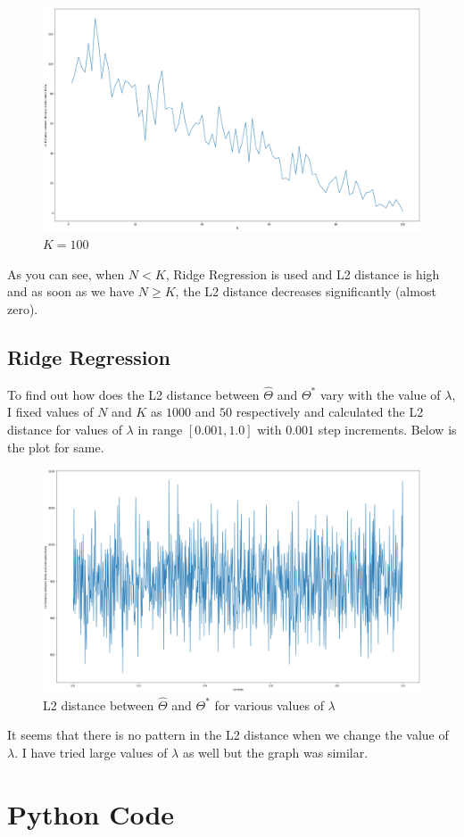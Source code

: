\documentclass{article}
\begin{document}
\begin{figure}[H]
  \includegraphics[width=\linewidth]{images/k-100.png}
  \caption{$K=100$}
\end{figure}

As you can see, when $N<K$, Ridge Regression is used and L2 distance is high and as soon as we have $N \geq K$, the L2 distance decreases significantly (almost zero).

\subsection{Ridge Regression}
To find out how does the L2 distance between $\hat{\Theta}$ and $\Theta^{*}$ vary with the value of $\lambda$, I fixed values of $N$ and $K$ as $1000$ and $50$ respectively and calculated the L2 distance for values of $\lambda$ in range $[0.001, 1.0]$ with $0.001$ step increments. Below is the plot for same.
\begin{figure}[H]
  \includegraphics[width=\linewidth]{images/lambda.png}
  \caption{L2 distance between $\hat{\Theta}$ and $\Theta^{*}$ for various values of $\lambda$}
\end{figure}

It seems that there is no pattern in the L2 distance when we change the value of $\lambda$. I have tried large values of $\lambda$ as well but the graph was similar. 

\appendix
\section{Python Code}
\end{document}
